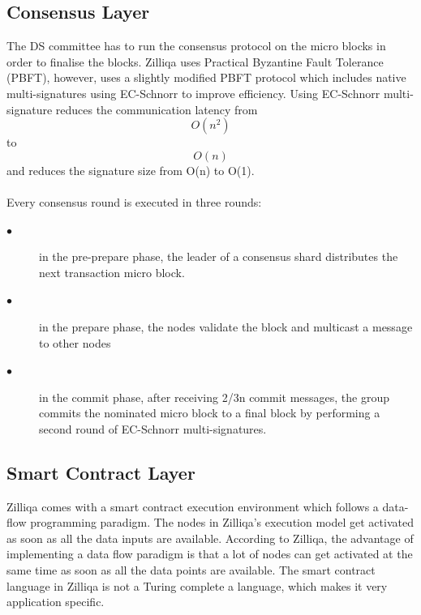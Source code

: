 \documentclass[a4paper,twoside,phd]{BYUPhys}
\begin{document}
\subsection{Consensus Layer}
The DS committee has to run the consensus protocol on the micro blocks in order to finalise the blocks\cite{}. Zilliqa uses Practical Byzantine Fault Tolerance (PBFT), however, uses a slightly modified PBFT protocol which includes native multi-signatures using EC-Schnorr to improve efficiency\cite{}. Using EC-Schnorr multi-signature reduces the communication latency from \[O(n^2)\] to \[O(n)\] and reduces the signature size from O(n) to O(1)\cite{}.
\\
\\
Every consensus round is executed in three rounds\cite{}:
\begin{description}
\item[$\bullet$] in the pre-prepare phase, the leader of a consensus shard distributes the next transaction micro block.
\item[$\bullet$] in the prepare phase, the nodes validate the block and multicast a message to other nodes
\item[$\bullet$] in the commit phase, after receiving 2/3n commit messages, the group commits the nominated micro block to a final block by performing a second round of EC-Schnorr multi-signatures.
\end{description}
\subsection{Smart Contract Layer}
Zilliqa comes with a smart contract execution environment which follows a data-flow programming paradigm\cite{}. The nodes in Zilliqa's execution model get activated as soon as all the data inputs are available. According to Zilliqa, the advantage of implementing a data flow paradigm is that a lot of nodes can get activated at the same time as soon as all the data points are available. The smart contract language in Zilliqa is not a Turing complete a language, which makes it very application specific. 
\end{document}
